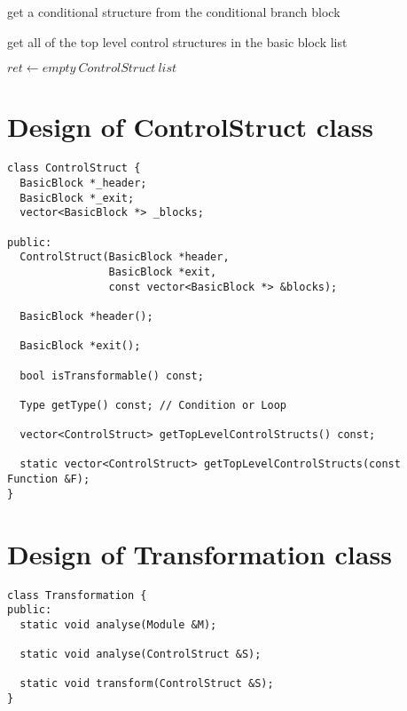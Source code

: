 \documentclass{article}
\begin{document}
\begin{algorithm}
  \caption{get a conditional structure from the conditional branch block}
  \begin{algorithmic}[1]
       
    \EndFunction
  \end{algorithmic}
\end{algorithm}

\begin{algorithm}
  \caption{get all of the top level control structures in the basic block list}
  \begin{algorithmic}[1]
      \State $ret \gets empty\ ControlStruct\ list$
             
          \Else
          \EndIf
         
        \EndIf
      \EndFor
    \EndFunction
  \end{algorithmic}
\end{algorithm}

\FloatBarrier
\section*{Design of ControlStruct class}
\begin{lstlisting}
class ControlStruct {
  BasicBlock *_header;
  BasicBlock *_exit;
  vector<BasicBlock *> _blocks;

public:
  ControlStruct(BasicBlock *header,
                BasicBlock *exit,
                const vector<BasicBlock *> &blocks);

  BasicBlock *header();

  BasicBlock *exit();

  bool isTransformable() const;

  Type getType() const; // Condition or Loop

  vector<ControlStruct> getTopLevelControlStructs() const;

  static vector<ControlStruct> getTopLevelControlStructs(const Function &F);
}
\end{lstlisting}

\section*{Design of Transformation class}
\begin{lstlisting}
class Transformation {
public:
  static void analyse(Module &M);

  static void analyse(ControlStruct &S);

  static void transform(ControlStruct &S);
}
\end{lstlisting}
\end{document}
